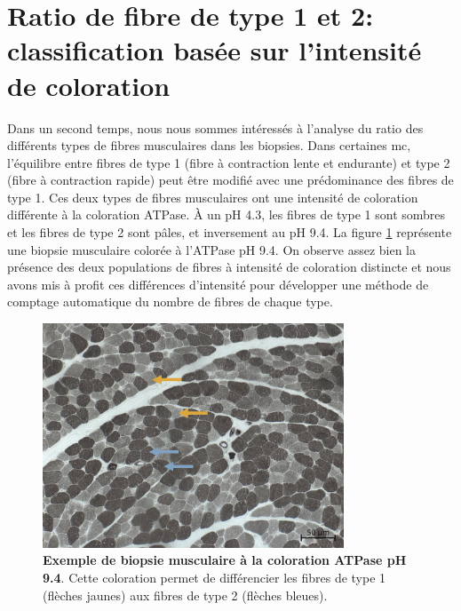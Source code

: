 \section{Ratio de fibre de type 1 et 2: classification basée sur l'intensité de coloration}

Dans un second temps, nous nous sommes intéressés à l'analyse du ratio des différents types de fibres musculaires dans les biopsies. Dans certaines \gls{mc}, l'équilibre entre fibres de type 1 (fibre à contraction lente et endurante) et type 2 (fibre à contraction rapide) peut être modifié avec une prédominance des fibres de type 1. Ces deux types de fibres musculaires ont une intensité de coloration différente à la coloration ATPase. À un pH 4.3, les fibres de type 1 sont sombres et les fibres de type 2 sont pâles, et inversement au pH 9.4. La figure \ref{fig:atp_example} représente une biopsie musculaire colorée à l'ATPase pH 9.4. On observe assez bien la présence des deux populations de fibres à intensité de coloration distincte et nous avons mis à profit ces différences d'intensité pour développer une méthode de comptage automatique du nombre de fibres de chaque type.
\begin{figure}[!htbp]
 \centering
 \includegraphics[width=0.8\textwidth]{figures/atp_example.png}
 \caption[Exemple de biopsie musculaire à la coloration ATPase pH 9.4]{\textbf{Exemple de biopsie musculaire à la coloration ATPase pH 9.4}. Cette coloration permet de différencier les fibres de type 1 (flèches jaunes) aux fibres de type 2 (flèches bleues).}
 \label{fig:atp_example}
\end{figure}
